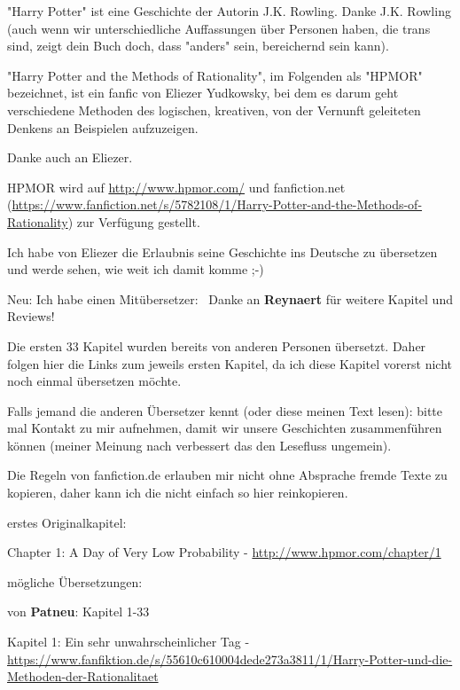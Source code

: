 

\hypertarget{vorwort-der-uxfcbersetzerin}{%

"Harry Potter" ist eine Geschichte der Autorin J.K. Rowling. Danke J.K. Rowling (auch wenn wir unterschiedliche Auffassungen über Personen haben, die trans sind, zeigt dein Buch doch, dass "anders" sein, bereichernd sein kann).

"Harry Potter and the Methods of Rationality", im Folgenden als "HPMOR" bezeichnet, ist ein fanfic von Eliezer Yudkowsky, bei dem es darum geht verschiedene Methoden des logischen, kreativen, von der Vernunft geleiteten Denkens an Beispielen aufzuzeigen.

Danke auch an Eliezer.

HPMOR wird auf \url{http://www.hpmor.com/} und fanfiction.net (\url{https://www.fanfiction.net/s/5782108/1/Harry-Potter-and-the-Methods-of-Rationality}) zur Verfügung gestellt.

Ich habe von Eliezer die Erlaubnis seine Geschichte ins Deutsche zu übersetzen und werde sehen, wie weit ich damit komme ;-)

Neu: Ich habe einen Mitübersetzer: ~Danke an \textbf{Reynaert} für weitere Kapitel und Reviews!

Die ersten 33 Kapitel wurden bereits von anderen Personen übersetzt. Daher folgen hier die Links zum jeweils ersten Kapitel, da ich diese Kapitel vorerst nicht noch einmal übersetzen möchte.

Falls jemand die anderen Übersetzer kennt (oder diese meinen Text lesen): bitte mal Kontakt zu mir aufnehmen, damit wir unsere Geschichten zusammenführen können (meiner Meinung nach verbessert das den Lesefluss ungemein).

Die Regeln von fanfiction.de erlauben mir nicht ohne Absprache fremde Texte zu kopieren, daher kann ich die nicht einfach so hier reinkopieren.

erstes Originalkapitel:

Chapter 1: A Day of Very Low Probability - \url{http://www.hpmor.com/chapter/1}

mögliche Übersetzungen:

von \textbf{Patneu}: Kapitel 1-33

Kapitel 1: Ein sehr unwahrscheinlicher Tag - \url{https://www.fanfiktion.de/s/55610c610004dede273a3811/1/Harry-Potter-und-die-Methoden-der-Rationalitaet}

}
